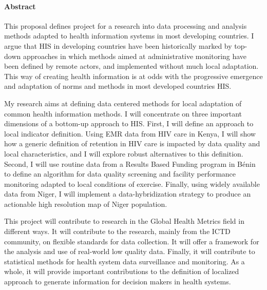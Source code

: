 \documentclass[a4paper,11pt,twoside]{article}
\begin{document}
\paragraph{Abstract}

This proposal defines project for a research into data processing and analysis methods adapted to health information systems in most developing countries. I argue that HIS in developing countries have been historically marked by top-down approaches in which methods aimed at administrative monitoring have been defined by remote actors, and implemented without much local adaptation. This way of creating health information is at odds with the progressive emergence and adaptation of norms and methods in most developed countries HIS.

My research aims at defining data centered methods for local adaptation of common health information methods. I will concentrate on three important dimensions of a bottom-up approach to HIS. First, I will define an approach to local indicator definition. Using EMR data from HIV care in Kenya, I will show how a generic definition of retention in HIV care is impacted by data quality and local characteristics, and I will explore robust alternatives to this definition. Second, I will use routine data from a Results Based Funding program in Bénin to define an algorithm for data quality screening and facility performance monitoring adapted to local conditions of exercise. Finally, using widely available data from Niger, I will implement a data-hybridization strategy to produce an actionable high resolution map of Niger population.

This project will contribute to research in the Global Health Metrics field in different ways. It will contribute to the research, mainly from the ICTD community, on flexible standards for data collection. It will offer a framework for the analysis and use of real-world low quality data. Finally, it will contribute to statistical methods for health system data surveillance and monitoring. As a whole, it will provide important contributions to the definition of  localized approach to generate information for decision makers in health systems.

\cleardoublepage
\tableofcontents
{}
\newpage
{}
\listoffigures
\newpage

\thispagestyle{fancy}
\end{document}
